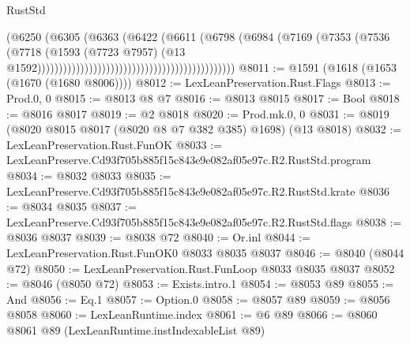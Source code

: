 \begin{lexlean}{RustStd}
\begin{coremodule}
                                                                      (@6250
                                                                        (@6305
                                                                          (@6363
                                                                            (@6422
                                                                              (@6611
                                                                                (@6798
                                                                                  (@6984
                                                                                    (@7169
                                                                                      (@7353
                                                                                        (@7536
                                                                                          (@7718
                                                                                            (@1593
                                                                                              (@7723
                                                                                                @7957)
                                                                                              (@13
                                                                                                @1592))))))))))))))))))))))))))))))))))))))))))))))
@8011 := @1591 (@1618 (@1653 (@1670 (@1680 @8006))))
@8012 := LexLeanPreservation.Rust.Flags
@8013 := Prod.{0, 0}
@8015 := @8013 @8 @7
@8016 := @8013 @8015
@8017 := Bool
@8018 := @8016 @8017
@8019 := @2 @8018
@8020 := Prod.mk.{0, 0}
@8031 := @8019 (@8020 @8015 @8017 (@8020 @8 @7 @382 @385) @1698) (@13 @8018)
@8032 := LexLeanPreservation.Rust.FunOK
@8033 := LexLeanPreserve.Cd93f705b885f15c843e9e082af05e97c.R2.RustStd.program
@8034 := @8032 @8033
@8035 := LexLeanPreserve.Cd93f705b885f15c843e9e082af05e97c.R2.RustStd.krate
@8036 := @8034 @8035
@8037 := LexLeanPreserve.Cd93f705b885f15c843e9e082af05e97c.R2.RustStd.flags
@8038 := @8036 @8037
@8039 := @8038 @72
@8040 := Or.inl
@8044 := LexLeanPreservation.Rust.FunOK0 @8033 @8035 @8037
@8046 := @8040 (@8044 @72)
@8050 := LexLeanPreservation.Rust.FunLoop @8033 @8035 @8037
@8052 := @8046 (@8050 @72)
@8053 := Exists.intro.{1}
@8054 := @8053 @89
@8055 := And
@8056 := Eq.{1}
@8057 := Option.{0}
@8058 := @8057 @89
@8059 := @8056 @8058
@8060 := LexLeanRuntime.index
@8061 := @6 @89
@8066 := @8060 @8061 @89 (LexLeanRuntime.instIndexableList @89)

\end{coremodule}
\end{lexlean}
